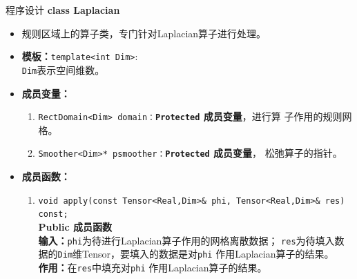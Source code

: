\documentclass{beamer}
\begin{document}
\begin{frame}{程序设计}
\textbf{\large class Laplacian}
\begin{itemize}
    \item 规则区域上的算子类，专门针对Laplacian算子进行处理。
    \item \textbf{模板：}\texttt{template<int Dim>}:\\
    \texttt{Dim}表示空间维数。
    \item \textbf{成员变量：}
        \begin{enumerate}[(1)]
            \item \texttt{RectDomain<Dim>
                domain：}\textbf{\texttt{Protected}  成员变量}，进行算
              子作用的规则网格。
            \item \texttt{Smoother<Dim>*
                  psmoother：}\textbf{\texttt{Protected}  成员变量}，
                松弛算子的指针。

               \end{enumerate}
    \item \textbf{成员函数：}
         \begin{enumerate}[(1)]
                       \item \texttt{void apply(const Tensor<Real,Dim>\& phi,
                Tensor<Real,Dim>\& res) const;}\\
              \textbf{Public 成员函数}\\
            \textbf{输入：}\texttt{phi}为待进行Laplacian算子作用的网格离散数据；
            \texttt{res}为待填入数据的\texttt{Dim}维Tensor，要填入的数据是对\texttt{phi}
            作用Laplacian算子的结果。\\
            \textbf{作用：}在\texttt{res}中填充对\texttt{phi}
            作用Laplacian算子的结果。
             \end{enumerate}
           \end{itemize}

         \end{frame}
\end{document}
